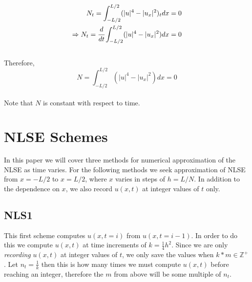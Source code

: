 \documentclass[11pt, oneside]{article}   	%
\begin{document}
\begin{align*}
    N_t = \int_{-L/2}^{L/2} (|u|^4 - |u_x|^2)_t dx = 0\\
    \Rightarrow N_t = \cfrac{d}{dt}\int_{-L/2}^{L/2} (|u|^4 - |u_x|^2) dx = 0\\
\end{align*}\\
Therefore,
\begin{equation}
N = \int_{-L/2}^{L/2} (|u|^4 - |u_x|^2) dx = 0
\end{equation}\\
Note that $N$ is constant with respect to time.

\section{NLSE Schemes}
In this paper we will cover three methods for numerical approximation of the NLSE as time varies. For the following methods we seek approximation of NLSE from $x = -L/2$ to $x = L/2$, where $x$ varies in steps of $h = L/N$. In addition to the dependence on $x$, we also record $u(x,t)$ at integer values of $t$ only.

\subsection{NLS1}
This first scheme computes $u(x,t = i)$ from $u(x,t = i - 1)$.
In order to do this we compute $u(x,t)$ at time increments of $k=\frac{1}{4}h^2$. Since we are only \textit{recording} $u(x,t)$ at integer values of $t$, we only save the values when $k*m \in \mathbb{Z}^+$. Let $n_t = \frac{1}{k}$ then this is how many times we must compute $u(x,t)$ before reaching an integer, therefore the $m$ from above will be some multiple of $n_t$.

\newline
\end{document}
